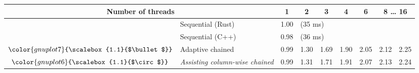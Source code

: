 \begin{tabular}{clrrrrrrr}
\toprule
\multicolumn{2}{c}{\textbf{Number of threads}} & \multicolumn{1}{c}{\textbf{ 1 }} & \multicolumn{1}{c}{\textbf{ 2 }} & \multicolumn{1}{c}{\textbf{ 3 }} & \multicolumn{1}{c}{\textbf{ 4 }} & \multicolumn{1}{c}{\textbf{ 6 }} & \multicolumn{2}{c}{\textbf{ 8 } \dots \textbf{ 16 }} \\
\midrule
& Sequential (Rust) & \multicolumn{1}{r}{ 1.00 } & \multicolumn{ 6 }{l}{(35 ms)} \\
& Sequential (C++) & \multicolumn{1}{r}{ 0.98 } & \multicolumn{ 6 }{l}{(36 ms)} \\
\rowcolor{gnuplot7!10}$\color{gnuplot7}{\scalebox{1.1}{$\bullet$}}$ & Adaptive chained & \cellcolor{gnuplot7!10} 0.99 & \cellcolor{gnuplot7!10} 1.30 & \cellcolor{gnuplot7!10} 1.69 & \cellcolor{gnuplot7!10} 1.90 & \cellcolor{gnuplot7!10} 2.05 & \cellcolor{gnuplot7!10} 2.12 & \cellcolor{gnuplot7!10} 2.25 \\
\rowcolor{gnuplot6!30}$\color{gnuplot6}{\scalebox{1.1}{$\circ$}}$ & \textit{Assisting column-wise chained} & \cellcolor{gnuplot6!30} 0.99 & \cellcolor{gnuplot6!30} 1.31 & \cellcolor{gnuplot6!30} 1.71 & \cellcolor{gnuplot6!30} 1.91 & \cellcolor{gnuplot6!30} 2.07 & \cellcolor{gnuplot6!30} 2.13 & \cellcolor{gnuplot6!30} 2.24 \\
\bottomrule
\end{tabular}
